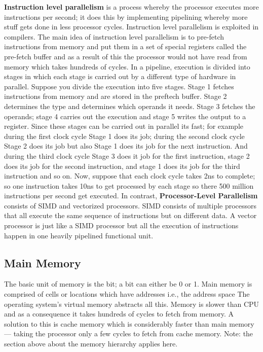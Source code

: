 \documentclass{amsbook}
\begin{document}
\textbf{Instruction level parallelism} is a process whereby the processor executes more instructions per second; it does this by implementing pipelining whereby more stuff gets done in less processor cycles. Instruction level parallelism is exploited in compilers. The main idea of instruction level parallelism is to pre-fetch instructions from memory and put them in a set of special registers called the pre-fetch buffer and as a result of this the processor would not have read from memory which takes hundreds of cycles. In a pipeline, execution is divided into stages in which each stage is carried out by a different type of hardware in parallel. Suppose you divide the execution into five stages. Stage 1 fetches instructions from memory and are stored in the preftech buffer. Stage 2  determines the type and determines which operands it needs. Stage 3 fetches the operands; stage 4 carries out the execution and stage 5 writes the output to a register. Since these stages can be carried out in parallel its fast; for example during the first clock cycle  Stage 1 does its job; during the second clock cycle Stage 2 does its job but also Stage 1 does its job for the next instruction. And during the third clock cycle Stage 3 does it job for the first instruction, stage 2 does its job for the second instruction, and stage 1 does its job for the third instruction and so on. Now, suppose that each clock cycle takes 2ns to complete; so one instruction takes 10ns to get processed by each stage so there 500 million instructions per second get executed. In contrast, \textbf{Processor-Level Parallelism} consists of SIMD and vectorized processors. SIMD consists of multiple processors that all execute the same sequence of instructions but on different data. A vector processor is just like a SIMD processor but all the execution of instructions happen in one heavily pipelined functional unit.

\subsection{Main Memory}

The basic unit of memory is the bit; a bit can either be 0 or 1. Main memory is comprised of cells or locations which have addresses i.e., the address space The operating system's virtual memory abstracts all this. Memory is slower than CPU and as a consequence it takes hundreds of cycles to fetch from memory. A solution to this is cache memory which is considerably faster than main memory --- taking the processor only a few cycles to fetch from cache memory. Note: the section above about the memory hierarchy applies here.
\end{document}
